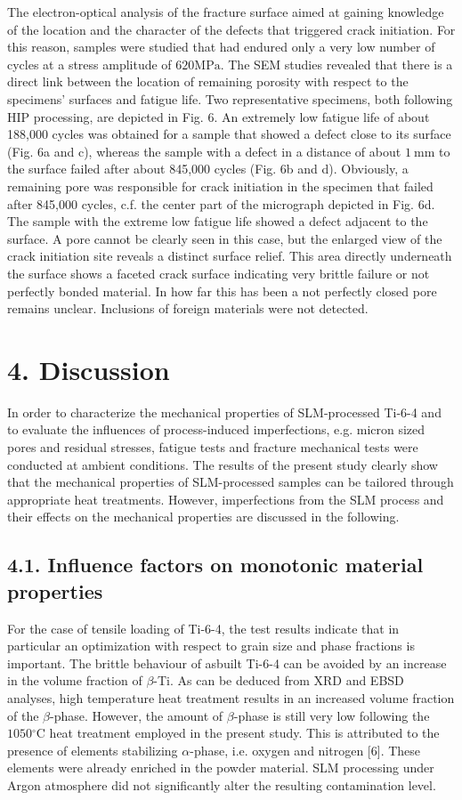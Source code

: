 \documentclass[10pt]{article}
\begin{document}
The electron-optical analysis of the fracture surface aimed at gaining knowledge of the location and the character of the defects that triggered crack initiation. For this reason, samples were studied that had endured only a very low number of cycles at a stress amplitude of $620 \mathrm{MPa}$. The SEM studies revealed that there is a direct link between the location of remaining porosity with respect to the specimens' surfaces and fatigue life. Two representative specimens, both following HIP processing, are depicted in Fig. 6. An extremely low fatigue life of about 188,000 cycles was obtained for a sample that showed a defect close to its surface (Fig. 6a and c), whereas the sample with a defect in a distance of about $1 \mathrm{~mm}$ to the surface failed after about 845,000 cycles (Fig. 6b and d). Obviously, a remaining pore was responsible for crack initiation in the specimen that failed after 845,000 cycles, c.f. the center part of the micrograph depicted in Fig. 6d. The sample with the extreme low fatigue life showed a defect adjacent to the surface. A pore cannot be clearly seen in this case, but the enlarged view of the crack initiation site reveals a distinct surface relief. This area directly underneath the surface shows a faceted crack surface indicating very brittle failure or not perfectly bonded material. In how far this has been a not perfectly closed pore remains unclear. Inclusions of foreign materials were not detected.

\section*{4. Discussion}
In order to characterize the mechanical properties of SLM-processed Ti-6-4 and to evaluate the influences of process-induced imperfections, e.g. micron sized pores and residual stresses, fatigue tests and fracture mechanical tests were conducted at ambient conditions. The results of the present study clearly show that the mechanical properties of SLM-processed samples can be tailored through appropriate heat treatments. However, imperfections from the SLM process and their effects on the mechanical properties are discussed in the following.

\subsection*{4.1. Influence factors on monotonic material properties}
For the case of tensile loading of Ti-6-4, the test results indicate that in particular an optimization with respect to grain size and phase fractions is important. The brittle behaviour of asbuilt Ti-6-4 can be avoided by an increase in the volume fraction of $\beta$-Ti. As can be deduced from XRD and EBSD analyses, high temperature heat treatment results in an increased volume fraction of the $\beta$-phase. However, the amount of $\beta$-phase is still very low following the $1050{ }^{\circ} \mathrm{C}$ heat treatment employed in the present study. This is attributed to the presence of elements stabilizing $\alpha$-phase, i.e. oxygen and nitrogen [6]. These elements were already enriched in the powder material. SLM processing under Argon atmosphere did not significantly alter the resulting contamination level.
\end{document}
